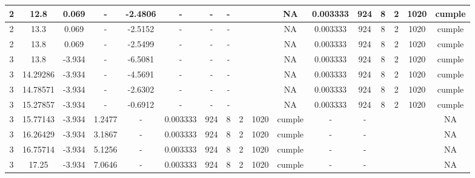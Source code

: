 \begin{table}[H]
{\begin{tabular}{|c|c|c|c|c|c|c|c|c|c|c|c|c|c|c|c|c|}
\hline
2   & 12.8 & 0.069 & -   & -2.4806 & -   & -   & -   &     &     & NA  & 0.003333 & 924 & 8   & 2   & 1020 & \cellcolor[rgb]{ .776,  .937,  .808}\textcolor[rgb]{ 0,  .38,  0}{cumple} \bigstrut\\
\hline
2   & 13.3 & 0.069 & -   & -2.5152 & -   & -   & -   &     &     & NA  & 0.003333 & 924 & 8   & 2   & 1020 & \cellcolor[rgb]{ .776,  .937,  .808}\textcolor[rgb]{ 0,  .38,  0}{cumple} \bigstrut\\
\hline
2   & 13.8 & 0.069 & -   & -2.5499 & -   & -   & -   &     &     & NA  & 0.003333 & 924 & 8   & 2   & 1020 & \cellcolor[rgb]{ .776,  .937,  .808}\textcolor[rgb]{ 0,  .38,  0}{cumple} \bigstrut\\
\hline
3   & 13.8 & -3.934 & -   & -6.5081 & -   & -   & -   &     &     & NA  & 0.003333 & 924 & 8   & 2   & 1020 & \cellcolor[rgb]{ .776,  .937,  .808}\textcolor[rgb]{ 0,  .38,  0}{cumple} \bigstrut\\
\hline
3   & 14.29286 & -3.934 & -   & -4.5691 & -   & -   & -   &     &     & NA  & 0.003333 & 924 & 8   & 2   & 1020 & \cellcolor[rgb]{ .776,  .937,  .808}\textcolor[rgb]{ 0,  .38,  0}{cumple} \bigstrut\\
\hline
3   & 14.78571 & -3.934 & -   & -2.6302 & -   & -   & -   &     &     & NA  & 0.003333 & 924 & 8   & 2   & 1020 & \cellcolor[rgb]{ .776,  .937,  .808}\textcolor[rgb]{ 0,  .38,  0}{cumple} \bigstrut\\
\hline
3   & 15.27857 & -3.934 & -   & -0.6912 & -   & -   & -   &     &     & NA  & 0.003333 & 924 & 8   & 2   & 1020 & \cellcolor[rgb]{ .776,  .937,  .808}\textcolor[rgb]{ 0,  .38,  0}{cumple} \bigstrut\\
\hline
3   & 15.77143 & -3.934 & 1.2477 & -   & 0.003333 & 924 & 8   & 2   & 1020 & \cellcolor[rgb]{ .776,  .937,  .808}\textcolor[rgb]{ 0,  .38,  0}{cumple} & -   & -   &     &     &     & NA \bigstrut\\
\hline
3   & 16.26429 & -3.934 & 3.1867 & -   & 0.003333 & 924 & 8   & 2   & 1020 & \cellcolor[rgb]{ .776,  .937,  .808}\textcolor[rgb]{ 0,  .38,  0}{cumple} & -   & -   &     &     &     & NA \bigstrut\\
\hline
3   & 16.75714 & -3.934 & 5.1256 & -   & 0.003333 & 924 & 8   & 2   & 1020 & \cellcolor[rgb]{ .776,  .937,  .808}\textcolor[rgb]{ 0,  .38,  0}{cumple} & -   & -   &     &     &     & NA \bigstrut\\
\hline
3   & 17.25 & -3.934 & 7.0646 & -   & 0.003333 & 924 & 8   & 2   & 1020 & \cellcolor[rgb]{ .776,  .937,  .808}\textcolor[rgb]{ 0,  .38,  0}{cumple} & -   & -   &     &     &     & NA \bigstrut\\

\end{tabular}}
\end{table}
